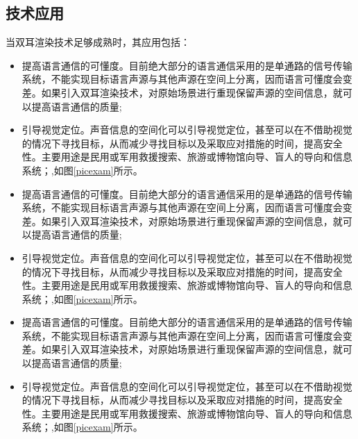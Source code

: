 \subsection{技术应用}
当双耳渲染技术足够成熟时，其应用包括：
\begin{itemize}[leftmargin=*]
\item 提高语言通信的可懂度。目前绝大部分的语言通信采用的是单通路的信号传输系统，不能实现目标语言声源与其他声源在空间上分离，因而语言可懂度会变差。如果引入双耳渲染技术，对原始场景进行重现保留声源的空间信息，就可以提高语言通信的质量;
\item 引导视觉定位。声音信息的空间化可以引导视觉定位，甚至可以在不借助视觉的情况下寻找目标，从而减少寻找目标以及采取应对措施的时间，提高安全性。主要用途是民用或军用救援搜索、旅游或博物馆向导、盲人的导向和信息系统；\cite{liu_approaching_2018},如图\ref{picexam}所示。
\item 提高语言通信的可懂度。目前绝大部分的语言通信采用的是单通路的信号传输系统，不能实现目标语言声源与其他声源在空间上分离，因而语言可懂度会变差。如果引入双耳渲染技术，对原始场景进行重现保留声源的空间信息，就可以提高语言通信的质量;
\item 引导视觉定位。声音信息的空间化可以引导视觉定位，甚至可以在不借助视觉的情况下寻找目标，从而减少寻找目标以及采取应对措施的时间，提高安全性。主要用途是民用或军用救援搜索、旅游或博物馆向导、盲人的导向和信息系统；\cite{liu_approaching_2018},如图\ref{picexam}所示。
\item 提高语言通信的可懂度。目前绝大部分的语言通信采用的是单通路的信号传输系统，不能实现目标语言声源与其他声源在空间上分离，因而语言可懂度会变差。如果引入双耳渲染技术，对原始场景进行重现保留声源的空间信息，就可以提高语言通信的质量;
\item 引导视觉定位。声音信息的空间化可以引导视觉定位，甚至可以在不借助视觉的情况下寻找目标，从而减少寻找目标以及采取应对措施的时间，提高安全性。主要用途是民用或军用救援搜索、旅游或博物馆向导、盲人的导向和信息系统；\cite{liu_approaching_2018},如图\ref{picexam}所示。
\end{itemize}

